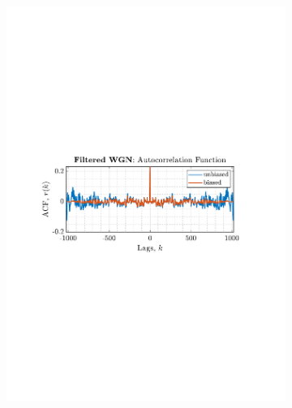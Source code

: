 \documentclass[12pt]{article}
\begin{document}
\begin{figure}[H]
\begin{subfigure}{0.49\textwidth}
			\includegraphics[trim={2.2cm 11cm 3.15cm  11.2cm}, clip, width=\textwidth]{../MATLAB/figures/q1_3a_fig06.pdf} 
		\end{subfigure}
		\begin{subfigure}{0.49\textwidth}
			\centering

\end{subfigure}
\end{figure}
\end{document}
